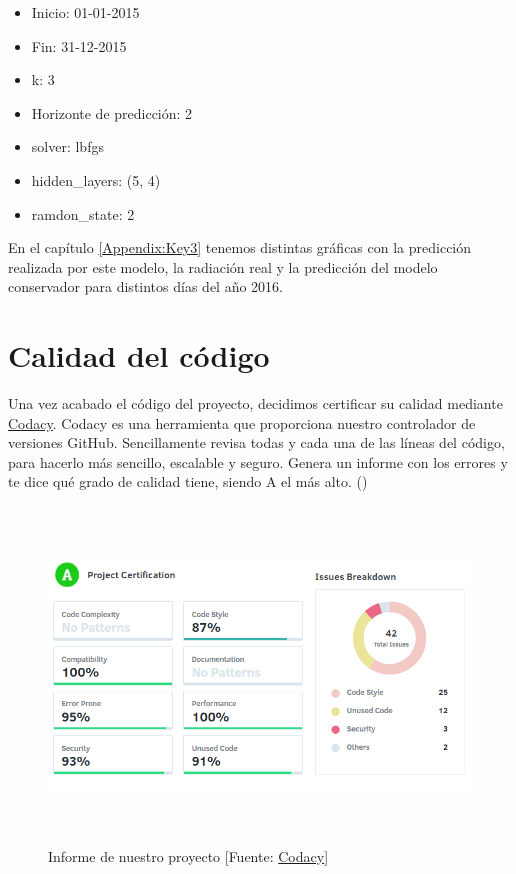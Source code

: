 \begin{itemize}
\item Inicio: 01-01-2015
\item Fin: 31-12-2015
\item k: 3
\item Horizonte de predicción: 2
\item solver: lbfgs
\item hidden\_layers: (5, 4)
\item ramdon\_state: 2
\end{itemize}

En el capítulo \ref{Appendix:Key3} tenemos distintas gráficas con la predicción realizada por este modelo, la radiación real y la predicción del modelo conservador para distintos días del año 2016.


\section{Calidad del código}
\label{makereference7.4}

Una vez acabado el código del proyecto, decidimos certificar su calidad mediante \href{https://www.codacy.com}{Codacy}.
Codacy es una herramienta que proporciona nuestro controlador de versiones GitHub. Sencillamente revisa todas y cada una de las líneas del código, para hacerlo más sencillo, escalable y seguro. Genera un informe con los errores y te dice qué grado de calidad tiene, siendo A el más alto. (\cite{ARP:Codacy:2017})

\begin{figure}[htb]
	\begin{center}
		\includegraphics[height=3.5in]{figures/codacy.png}
		\caption{Informe de nuestro proyecto [Fuente: \href{https://www.codacy.com}{Codacy}] \label{codacy}}
	\end{center}
\end{figure}